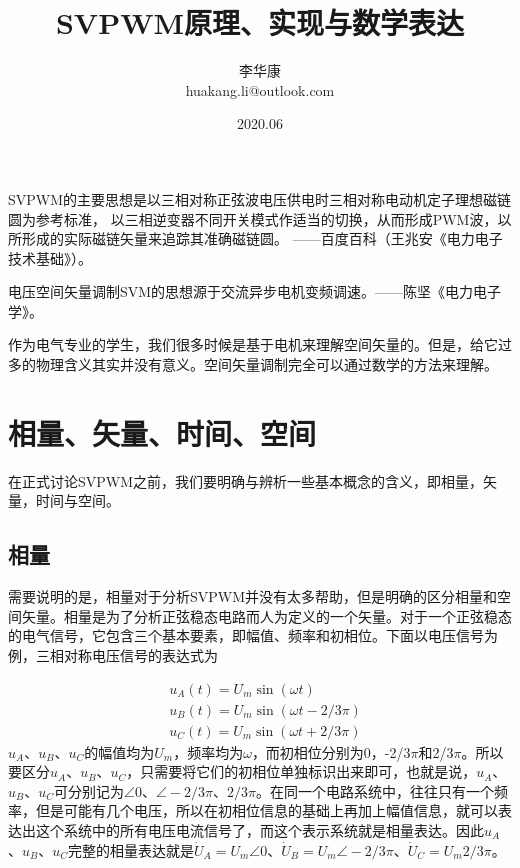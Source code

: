 \documentclass{ctexart}
\numberwithin{equation}{section}
\begin{document}
\title{\heiti SVPWM原理、实现与数学表达}    
\author{\kaishu 李华康 \\huakang.li@outlook.com}  
\date{2020.06}
\maketitle


SVPWM的主要思想是以三相对称正弦波电压供电时三相对称电动机定子理想磁链圆为参考标准，
以三相逆变器不同开关模式作适当的切换，从而形成PWM波，以所形成的实际磁链矢量来追踪其准确磁链圆。
——百度百科（王兆安《电力电子技术基础》）。

电压空间矢量调制SVM的思想源于交流异步电机变频调速。——陈坚《电力电子学》。

作为电气专业的学生，我们很多时候是基于电机来理解空间矢量的。但是，给它过多的物理含义其实并没有意义。空间矢量调制完全可以通过数学的方法来理解。

\section{相量、矢量、时间、空间}
在正式讨论SVPWM之前，我们要明确与辨析一些基本概念的含义，即相量，矢量，时间与空间。

\subsection{相量}
需要说明的是，相量对于分析SVPWM并没有太多帮助，但是明确的区分相量和空间矢量。相量是为了分析正弦稳态电路而人为定义的一个矢量。对于一个正弦稳态的电气信号，它包含三个基本要素，即幅值、频率和初相位。下面以电压信号为例，三相对称电压信号的表达式为

\begin{equation}
  \begin{aligned}
  	&u_A(t) = U_m \sin (\omega t)\\
  	&u_B(t) = U_m \sin (\omega t - 2/3\pi)\\
  	&u_C(t) = U_m \sin (\omega t + 2/3\pi)
  \end{aligned}
\end{equation}
$ u_A $、$ u_B $、$ u_C $的幅值均为$ U_m $，频率均为$ \omega $，而初相位分别为0，-2/3$ \pi $和2/3$ \pi $。所以要区分$ u_A $、$ u_B $、$ u_C $，只需要将它们的初相位单独标识出来即可，也就是说，$ u_A $、$ u_B $、$ u_C $可分别记为$ \angle 0 $、$ \angle -2/3\pi $、$ 2/3\pi $。在同一个电路系统中，往往只有一个频率，但是可能有几个电压，所以在初相位信息的基础上再加上幅值信息，就可以表达出这个系统中的所有电压电流信号了，而这个表示系统就是相量表达。因此$ u_A $、$ u_B $、$ u_C $完整的相量表达就是$ \dot U_A = U_m\angle 0 $、$ \dot U_B = U_m\angle -2/3\pi $、$\dot U_C = U_m2/3\pi $。
\end{document}
